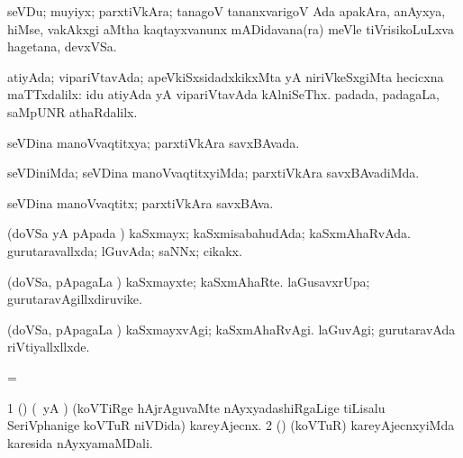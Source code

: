 \bentry
{} 
\gl{\nA}
\expl{}
\bmng
 seVDu; muyiyx; parxtiVkAra; tanagoV tananxvarigoV Ada apakAra, anAyxya, hiMse, \mo vakAkxgi aMtha kaqtayxvanunx mADidavana(ra) meVle tiVrisikoLuLxva hagetana, devxVSa. 
\emng

\noindent 
\gl{\pagu}
\expl{}
\bmng
  atiyAda; vipariVtavAda; apeVkiSxsidadxkikxMta yA niriVkeSxgiMta hecicxna maTTxdalilx: 
\banum
{}  idu atiyAda yA vipariVtavAda kAlniSeThx. 
 padada, padagaLa, saMpUNR athaRdalilx. 
\eanum
\emng
\eentry

\bentry 
{} 
\gl{\gu}
\expl{}
\bmng
 seVDina manoVvaqtitxya; parxtiVkAra savxBAvada. 
\emng
\eentry

\bentry
{} 
\gl{\kirxvi}
\expl{}
\bmng
 seVDiniMda; seVDina manoVvaqtitxyiMda; parxtiVkAra savxBAvadiMda. 
\emng
\eentry

\bentry
{} 
\gl{\nA}
\expl{}
\bmng
 seVDina manoVvaqtitx; parxtiVkAra savxBAva. 
\emng
\eentry

\bentry
{} 
\gl{\gu}
\expl{}
\bmng
 (doVSa yA pApada \vi) 
\banum
{} kaSxmayx; kaSxmisabahudAda; kaSxmAhaRvAda. 
 gurutaravallxda; lGuvAda; saNNx; cikakx. 
\eanum
\emng
\eentry

\bentry
{} 
\gl{\nA}
\expl{}
\bmng
 (doVSa, pApagaLa \vi) 
\banum
{} kaSxmayxte; kaSxmAhaRte. 
 laGusavxrUpa; gurutaravAgillxdiruvike. 
\eanum
\emng
\eentry

\bentry
{} 
\gl{\kirxvi}
\expl{}
\bmng
 (doVSa, pApagaLa \vi) 
\banum
{} kaSxmayxvAgi; kaSxmAhaRvAgi. 
 laGuvAgi; gurutaravAda riVtiyallxllxde. 
\eanum
\emng
\eentry

\bentry
{} 
\gl{\nA}
\expl{}
\bmng
\emng
\eentry

\bentry
{} 
\gl{\nA}
\expl{}
\bmng
=  
\emng
\eentry

\bentry
{} 
\gl{\nA}
\expl{}
\bmng
\bnum
\num{1} (\nAyxshA) (\ca\ yA \ame) (koVTiRge hAjrAguvaMte nAyxyadashiRgaLige tiLisalu SeriVphanige koVTuR niVDida) kareyAjecnx. 
\num{2} (\ame) (koVTuR) kareyAjecnxyiMda karesida nAyxyamaMDali. 
\enum
\emng
\eentry

